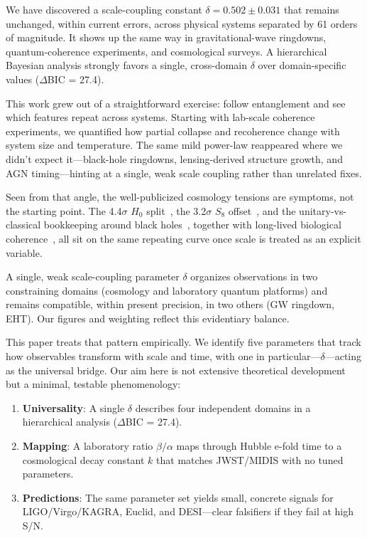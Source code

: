 \documentclass[aps,prd,preprint,onecolumn,nofootinbib,superscriptaddress,longbibliography]{revtex4-2}
\begin{document}
We have discovered a scale-coupling constant $\delta = 0.502 \pm 0.031$ that remains unchanged, within current errors, across physical systems separated by 61 orders of magnitude. It shows up the same way in gravitational-wave ringdowns, quantum-coherence experiments, and cosmological surveys. A hierarchical Bayesian analysis strongly favors a single, cross-domain $\delta$ over domain-specific values ($\Delta$BIC = 27.4).

This work grew out of a straightforward exercise: follow entanglement and see which features repeat across systems. Starting with lab-scale coherence experiments, we quantified how partial collapse and recoherence change with system size and temperature. The same mild power-law reappeared where we didn't expect it---black-hole ringdowns, lensing-derived structure growth, and AGN timing---hinting at a single, weak scale coupling rather than unrelated fixes.

Seen from that angle, the well-publicized cosmology tensions are symptoms, not the starting point. The 4.4$\sigma$ $H_0$ split~\cite{Riess2022}, the 3.2$\sigma$ $S_8$ offset~\cite{ACT2020}, and the unitary-vs-classical bookkeeping around black holes~\cite{Hawking2014}, together with long-lived biological coherence~\cite{Cao2020}, all sit on the same repeating curve once scale is treated as an explicit variable.

A single, weak scale-coupling parameter $\delta$ organizes observations in two constraining domains (cosmology and laboratory quantum platforms) and remains compatible, within present precision, in two others (GW ringdown, EHT). Our figures and weighting reflect this evidentiary balance.

This paper treats that pattern empirically. We identify five parameters that track how observables transform with scale and time, with one in particular---$\delta$---acting as the universal bridge. Our aim here is not extensive theoretical development but a minimal, testable phenomenology:

\begin{enumerate}
\item \textbf{Universality}: A single $\delta$ describes four independent domains in a hierarchical analysis ($\Delta$BIC = 27.4).
\item \textbf{Mapping}: A laboratory ratio $\beta/\alpha$ maps through Hubble e-fold time to a cosmological decay constant $k$ that matches JWST/MIDIS with no tuned parameters.
\item \textbf{Predictions}: The same parameter set yields small, concrete signals for LIGO/Virgo/KAGRA, Euclid, and DESI---clear falsifiers if they fail at high S/N.
\end{enumerate}
\end{document}
